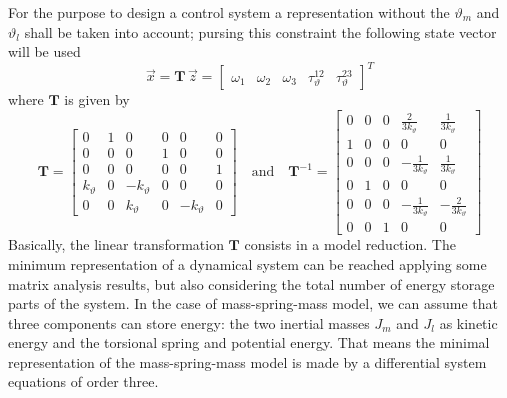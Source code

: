 \documentclass[12pt,a4paper]{scrartcl}
\begin{document}
\begin{onehalfspace}
For the purpose to design a control system a representation without the $\vartheta_m$ and $\vartheta_l$ shall be taken into account; pursing this constraint the following state vector will be used
\begin{equation}
	\vec{x} = \mathbf{T} \, \vec{z} = \begin{bmatrix} \omega_1 & \omega_2 & \omega_3 & \tau_{\vartheta}^{12} & \tau_{\vartheta}^{23} \end{bmatrix}^T
\end{equation}
where $\mathbf{T}$ is 
given by
\begin{equation}
	\mathbf{T} = \left[\begin{matrix}
		0 & 1 & 0 & 0 & 0 & 0\\[6pt]
		0 & 0 & 0 & 1 & 0 & 0 \\[6pt]
		0 & 0 & 0 & 0 & 0 & 1 \\[6pt]
		k_{\vartheta} & 0 & -k_{\vartheta} & 0 & 0 & 0 \\[6pt]
		0 & 0 & k_{\vartheta} & 0 & -k_{\vartheta} & 0
	\end{matrix}\right]
	\quad \text{and} \quad
	\mathbf{T}^{-1} = \left[\begin{matrix}
		0 & 0 & 0 & \frac{2}{3k_{\vartheta}} & \frac{1}{3k_{\vartheta}} \\[6pt]
		1 & 0 & 0 & 0 & 0 \\[6pt]
		0 & 0 & 0 & -\frac{1}{3k_{\vartheta}} & \frac{1}{3k_{\vartheta}} \\[6pt]
		0 & 1 & 0 & 0 & 0 \\[6pt]
		0 & 0 & 0 & -\frac{1}{3k_{\vartheta}} & -\frac{2}{3k_{\vartheta}} \\[6pt]
		0 & 0 & 1 & 0 & 0
	\end{matrix}\right]
\end{equation}
Basically, the linear transformation $\mathbf{T}$ consists in a model reduction. The minimum representation of a dynamical system can be reached applying some matrix analysis results, but also considering the total number of energy storage parts of the system. In the case of mass-spring-mass model, we can assume that three components can store energy: the two inertial masses $J_m$ and $J_l$ as kinetic energy and the torsional spring and potential energy. That means the minimal representation of the mass-spring-mass model is made by a differential system equations of order three.


\end{onehalfspace}
\end{document}
